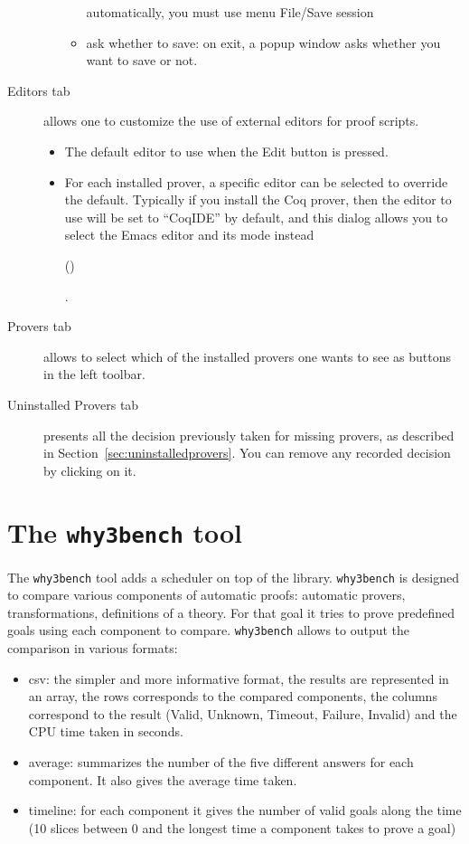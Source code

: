 \begin{description}
\begin{itemize}
\begin{itemize}
    automatically, you must use menu \textsf{File/Save session}
  \item ask whether to save: on exit, a popup window asks whether you
    want to save or not.
  \end{itemize}
\end{itemize}
\item[\textsf{Editors} tab] allows one to customize the use
  of external editors for proof scripts.
\begin{itemize}
\item The default editor to use when the \textsf{Edit} button is
  pressed.
\item For each installed prover, a specific editor can be selected to
  override the default. Typically if you install the Coq prover, then
  the editor to use will be set to ``CoqIDE'' by default, and this
  dialog allows you to select the Emacs editor and its
  mode instead%
 \begin{latexonly} (\urlprfgen)\end{latexonly}.
\end{itemize}
\item[\textsf{Provers} tab]
  allows to select which of the installed provers one wants to see
  as buttons in the left toolbar.
\item[\textsf{Uninstalled Provers} tab] presents all the
  decision previously taken for missing provers, as described in
  Section~\ref{sec:uninstalledprovers}. You can remove any recorded
  decision by clicking on it.
\end{description}


\section{The \texttt{why3bench} tool}

The \texttt{why3bench} tool adds a scheduler on top of the \why
library. \texttt{why3bench} is designed to compare various components
of automatic proofs: automatic provers, transformations, definitions
of a theory. For that goal it tries to prove predefined goals using
each component to compare. \texttt{why3bench} allows to output the
comparison in various formats:
\begin{itemize}
\item csv: the simpler and more informative format, the results are
  represented in an array, the rows corresponds to the
  compared components, the columns correspond to the result
  (Valid, Unknown, Timeout, Failure, Invalid) and the CPU time taken in seconds.
\item average: summarizes the number of the five different answers
  for each component. It also gives the average time taken.
\item timeline: for each component it gives the number of valid goals
  along the time (10 slices between 0 and the longest time a component
  takes to prove a goal)
\end{itemize}

